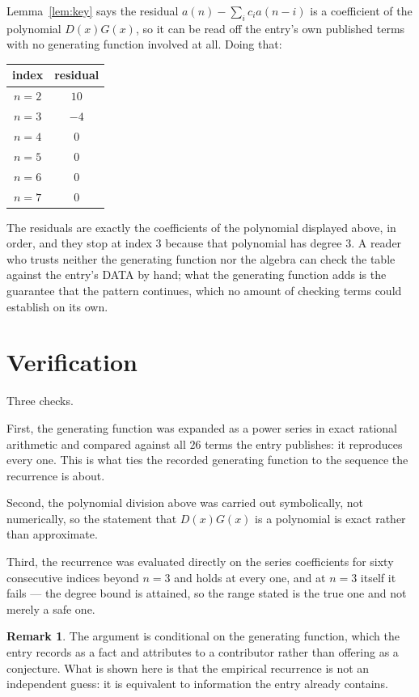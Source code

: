 \documentclass[11pt,a4paper]{article}
\theoremstyle{plain}
\theoremstyle{definition}
\newtheorem{remark}[theorem]{Remark}
\begin{document}
Lemma~\ref{lem:key} says the residual $a(n)-\sum_ic_ia(n-i)$ is a coefficient of the
polynomial $D(x)G(x)$, so it can be read off the entry's own published terms with no
generating function involved at all. Doing that:
\begin{center}
\begin{tabular}{cc}
index & residual \\ \hline
$n=2$ & $10$ \\
$n=3$ & $-4$ \\
$n=4$ & $0$ \\
$n=5$ & $0$ \\
$n=6$ & $0$ \\
$n=7$ & $0$
\end{tabular}
\end{center}
The residuals are exactly the coefficients of the polynomial displayed above, in order, and
they stop at index $3$ because that polynomial has degree $3$. A reader who trusts
neither the generating function nor the algebra can check the table against the entry's DATA
by hand; what the generating function adds is the guarantee that the pattern continues, which
no amount of checking terms could establish on its own.

\section{Verification}

Three checks.

First, the generating function was expanded as a power series in exact rational arithmetic and
compared against all $26$ terms the entry publishes: it reproduces every one. This is
what ties the recorded generating function to the sequence the recurrence is about.

Second, the polynomial division above was carried out symbolically, not numerically, so the
statement that $D(x)G(x)$ is a polynomial is exact rather than approximate.

Third, the recurrence was evaluated directly on the series coefficients for sixty consecutive
indices beyond $n=3$ and holds at every one, and at $n=3$ itself it fails --- the
degree bound is attained, so the range stated is the true one and not merely a safe one.

\begin{remark}
The argument is conditional on the generating function, which the entry records as a fact and
attributes to a contributor rather than offering as a conjecture. What is shown here is that
the empirical recurrence is not an independent guess: it is equivalent to information the
entry already contains.
\end{remark}
\end{document}
